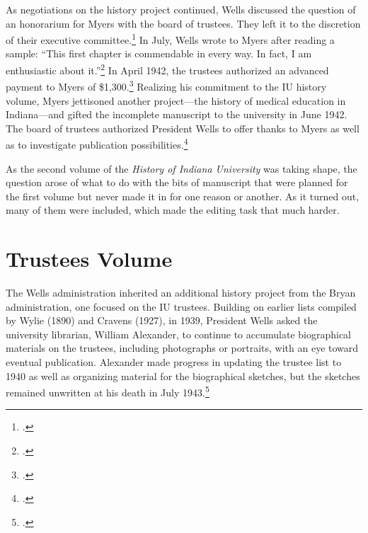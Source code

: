 \documentclass[
  american,
  letterpaper,
]{scrreprt}
\begin{document}
As negotiations on the history project continued, Wells discussed the
question of an honorarium for Myers with the board of trustees. They
left it to the discretion of their executive committee.\footnote{.}
In July, Wells wrote to Myers after reading a sample: ``This first
chapter is commendable in every way. In fact, I am enthusiastic about
it.''\footnote{.}
In April 1942, the trustees authorized an advanced payment to Myers of
\$1,300.\footnote{.} Realizing his commitment to the IU history volume,
Myers jettisoned another project---the history of medical education in
Indiana---and gifted the incomplete manuscript to the university in June
1942. The board of trustees authorized President Wells to offer thanks
to Myers as well as to investigate publication possibilities.\footnote{.}

As the second volume of the \emph{History of Indiana University} was
taking shape, the question arose of what to do with the bits of
manuscript that were planned for the first volume but never made it in
for one reason or another. As it turned out, many of them were included,
which made the editing task that much harder.

\section{Trustees Volume}\label{trustees-volume}

The Wells administration inherited an additional history project from
the Bryan administration, one focused on the IU trustees. Building on
earlier lists compiled by Wylie (1890) and Cravens (1927), in 1939,
President Wells asked the university librarian, William Alexander, to
continue to accumulate biographical materials on the trustees, including
photographs or portraits, with an eye toward eventual publication.
Alexander made progress in updating the trustee list to 1940 as well as
organizing material for the biographical sketches, but the sketches
remained unwritten at his death in July 1943.\footnote{.}
\end{document}
